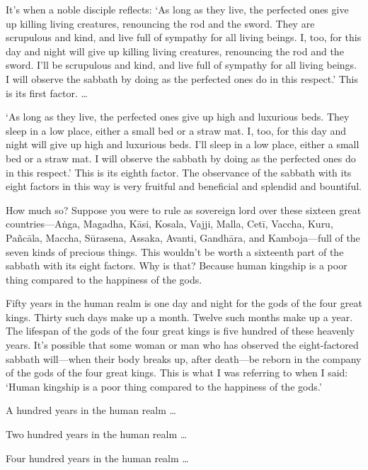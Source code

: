 \documentclass[12pt,openany]{book}%
\begin{document}
It’s when a noble disciple reflects: ‘As long as they live, the perfected ones give up killing living creatures, renouncing the rod and the sword. They are scrupulous and kind, and live full of sympathy for all living beings. I, too, for this day and night will give up killing living creatures, renouncing the rod and the sword. I’ll be scrupulous and kind, and live full of sympathy for all living beings. I will observe the sabbath by doing as the perfected ones do in this respect.’ This is its first factor. … 

‘As long as they live, the perfected ones give up high and luxurious beds. They sleep in a low place, either a small bed or a straw mat. I, too, for this day and night will give up high and luxurious beds. I’ll sleep in a low place, either a small bed or a straw mat. I will observe the sabbath by doing as the perfected ones do in this respect.’ This is its eighth factor. The observance of the sabbath with its eight factors in this way is very fruitful and beneficial and splendid and bountiful. 

How much so? Suppose you were to rule as sovereign lord over these sixteen great countries—\textsanskrit{Aṅga}, Magadha, \textsanskrit{Kāsi}, Kosala, Vajji, Malla, \textsanskrit{Cetī}, Vaccha, Kuru, \textsanskrit{Pañcāla}, Maccha, \textsanskrit{Sūrasena}, Assaka, Avanti, \textsanskrit{Gandhāra}, and Kamboja—full of the seven kinds of precious things. This wouldn’t be worth a sixteenth part of the sabbath with its eight factors. Why is that? Because human kingship is a poor thing compared to the happiness of the gods. 

Fifty years in the human realm is one day and night for the gods of the four great kings. Thirty such days make up a month. Twelve such months make up a year. The lifespan of the gods of the four great kings is five hundred of these heavenly years. It’s possible that some woman or man who has observed the eight-factored sabbath will—when their body breaks up, after death—be reborn in the company of the gods of the four great kings. This is what I was referring to when I said: ‘Human kingship is a poor thing compared to the happiness of the gods.’ 

A hundred years in the human realm … 

Two hundred years in the human realm … 

Four hundred years in the human realm … 
\end{document}
